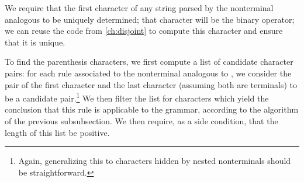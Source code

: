     We require that the first character of any string parsed by the nonterminal analogous to  be uniquely determined; that character will be the binary operator; we can reuse the code from \autoref{ch:disjoint} to compute this character and ensure that it is unique.
    
    To find the parenthesis characters, we first compute a list of candidate character pairs: for each rule associated to the nonterminal analogous to , we consider the pair of the first character and the last character (assuming both are terminals) to be a candidate pair.\footnote{Again, generalizing this to characters hidden by nested nonterminals should be straightforward.}  We then filter the list for characters which yield the conclusion that this rule is applicable to the grammar, according to the algorithm of the previous subsubsection.  We then require, as a side condition, that the length of this list be positive.
    

